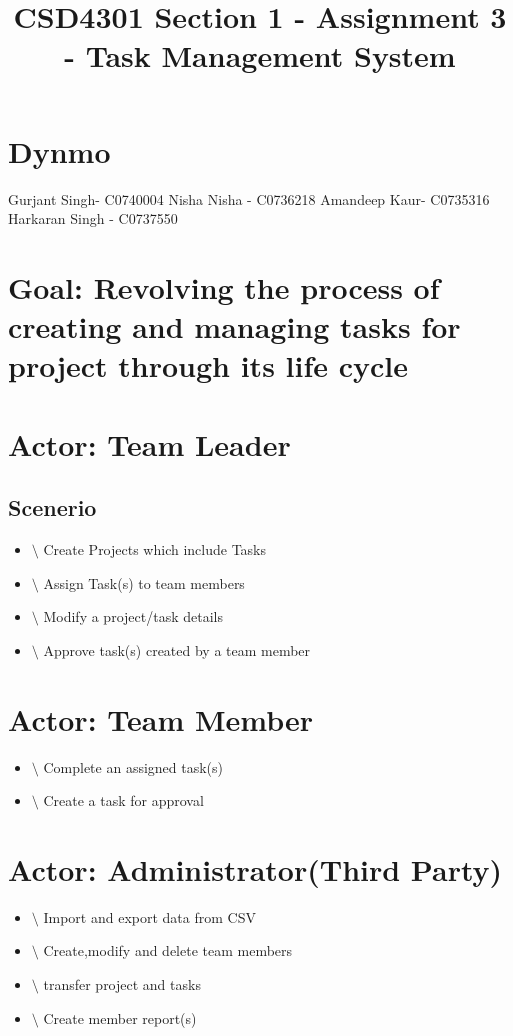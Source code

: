 \documentclass[10 pm]{article}
\title  {CSD4301 Section 1 - Assignment 3 - Task Management System }
\begin{document}
\maketitle

\section * {Dynmo}

Gurjant Singh- C0740004
Nisha Nisha - C0736218
Amandeep Kaur- C0735316
Harkaran Singh - C0737550

\section{Goal: Revolving the process of creating and managing tasks for project through its life cycle}
\section{Actor: Team Leader}
\subsection  {Scenerio}
\begin{itemize}
\item $ \setminus $ Create Projects which include Tasks 
\item $ \setminus $ Assign Task(s) to team members
\item $ \setminus $ Modify a project/task details
\item $ \setminus $ Approve task(s) created by a team member
\end{itemize}
\section{Actor: Team Member}
\begin{itemize}
\subsection {Scenerio}
\item $ \setminus $ Complete an assigned task(s)
\item $ \setminus $ Create a task for approval
\end{itemize}
\section{Actor: Administrator(Third Party)}
\begin{itemize}
\subsection {Scenerio}
\item $ \setminus $ Import and export data from CSV
\item $ \setminus $ Create,modify and delete team members
\item $ \setminus $ transfer project and tasks
\item $ \setminus $ Create member report(s)
\end{itemize}
\end{document}
